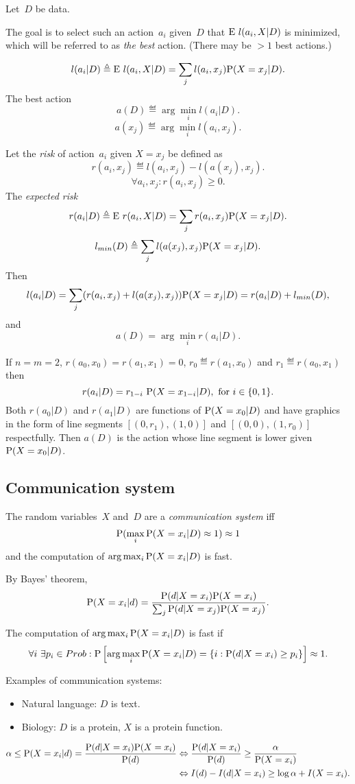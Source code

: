 \documentclass[10pt,a4paper]{article}
\theoremstyle{plain} \newtheorem{Lem}{Lemma}
\begin{document}
Let~$D$ be data.

The goal is to select such an action~$a_i$ given~$D$ that $\E l(a_i, X|D)$ is minimized,
which will be referred to as {\em the best} action.
(There may be $>1$ best actions.)

$$ l(a_i|D) \eqdef \E l(a_i, X|D) = \sum_j l(a_i,x_j) \P (X=x_j|D). $$
The best action
$$ a(D) \eqdef \arg\min_i l(a_i|D). $$
$$ a(x_j) \eqdef \arg \min_i l(a_i,x_j). $$

Let the {\em risk} of action~$a_i$ given $X=x_j$ be defined as
$$ r(a_i,x_j) \eqdef l(a_i,x_j) - l(a(x_j),x_j). $$
$$ \forall a_i, x_j : r(a_i,x_j) \ge 0. $$
The {\em expected risk}
$$ r(a_i|D) \eqdef  \E r(a_i, X|D) = \sum_j r(a_i,x_j) \P (X=x_j|D). $$
$$ l_{min}(D) \eqdef \sum_j l(a(x_j),x_j) \P (X=x_j|D). $$
Then
$$ l(a_i|D) = \sum_j (r(a_i,x_j) + l(a(x_j),x_j)) \P (X=x_j|D) = r(a_i|D) + l_{min}(D), $$
and
$$ a(D) = \arg \min_i r(a_i|D). $$

If $n = m = 2$, $r(a_0,x_0) = r(a_1,x_1) = 0$, $r_0 \eqdef r(a_1,x_0)$ and $r_1 \eqdef r(a_0,x_1)$ then
$$ r(a_i|D) = r_{1-i} \ \P (X = x_{1-i}|D), \text{ for } i \in \{0,1\}. $$
Both $r(a_0|D)$ and $r(a_1|D)$ are functions of $\P(X=x_0|D)$
and have graphics in the form of line segments $[(0,r_1),(1,0)]$ and $[(0,0),(1,r_0)]$ respectfully.
Then $a(D)$ is the action whose line segment is lower given $\P(X=x_0|D)$.


\subsection {Communication system}
The random variables~$X$ and~$D$ are a {\em communication system} iff
$$ \P(\max_i \P(X=x_i|D) \approx 1) \approx 1 $$
and the computation of $\arg \max_i \P(X=x_i|D)$ is fast.

By Bayes' theorem,
$$ \P(X=x_i|d) = \frac {\P(d|X=x_i) \P(X=x_i)} {\sum_j \P(d|X=x_j) \P(X=x_j)}. $$

The computation of $\arg \max_i \P(X=x_i|D)$ is fast if
$$ \forall i \ \exists p_i \in Prob : \P\left[\arg \max_i \P(X=x_i|D) = \{i: \P(d|X=x_i) \ge p_i\} \right] \approx 1. $$

Examples of communication systems:
\begin{itemize}
\item Natural language: $D$ is text.
\item Biology: $D$ is a protein, $X$ is a protein function.
\end{itemize}

\begin{equation*}
\begin{split}
 \alpha \le \P(X=x_i|d) = \frac {\P(d|X=x_i) \P(X=x_i)} {\P(d)} &\equivalent \frac {\P(d|X=x_i)} {\P(d)} \ge  \frac \alpha {\P(X=x_i)} \\
   &\equivalent I(d) - I(d|X=x_i) \ge \log \alpha + I(X=x_i).
\end{split}
\end{equation*}
\end{document}
